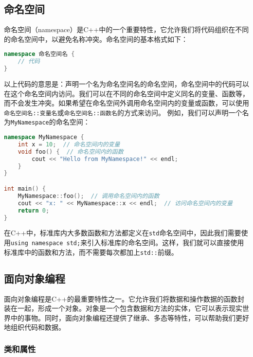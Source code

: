 \documentclass[../main.tex]{subfiles}
\begin{document}
\subsection{命名空间}

命名空间（namespace）是C++中的一个重要特性，它允许我们将代码组织在不同的命名空间中，以避免名称冲突。命名空间的基本格式如下：
\begin{lstlisting}[language=C++]
namespace 命名空间名 {
    // 代码
}
\end{lstlisting}
以上代码的意思是：声明一个名为命名空间名的命名空间，命名空间中的代码可以在这个命名空间内访问。我们可以在不同的命名空间中定义同名的变量、函数等，而不会发生冲突。如果希望在命名空间外调用命名空间内的变量或函数，可以使用\texttt{命名空间名::变量名}或\texttt{命名空间名::函数名}的方式来访问。
例如，我们可以声明一个名为\texttt{MyNamespace}的命名空间：
\begin{lstlisting}[language=C++]
namespace MyNamespace {
    int x = 10;  // 命名空间内的变量
    void foo() {  // 命名空间内的函数
        cout << "Hello from MyNamespace!" << endl;
    }
}

int main() {
    MyNamespace::foo();  // 调用命名空间内的函数
    cout << "x: " << MyNamespace::x << endl;  // 访问命名空间内的变量
    return 0;
}
\end{lstlisting}

在C++中，标准库内大多数函数和方法都定义在\texttt{std}命名空间中，因此我们需要使用\texttt{using namespace std;}来引入标准库的命名空间。这样，我们就可以直接使用标准库中的函数和方法，而不需要每次都加上\texttt{std::}前缀。

\subsection{面向对象编程}

面向对象编程是C++的最重要特性之一。它允许我们将数据和操作数据的函数封装在一起，形成一个对象。对象是一个包含数据和方法的实体，它可以表示现实世界中的事物。同时，面向对象编程还提供了继承、多态等特性，可以帮助我们更好地组织代码和数据。

\subsubsection{类和属性}
\end{document}
